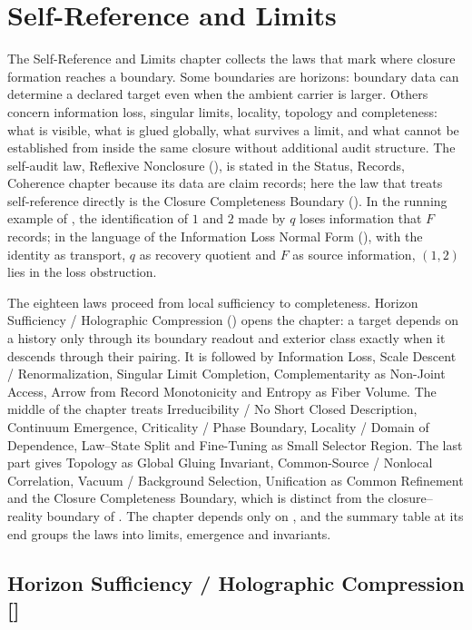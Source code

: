\section{Self-Reference and Limits}\label{sec:self-reference-limits}

The Self-Reference and Limits chapter collects the laws that mark where
closure formation reaches a boundary.  Some boundaries are horizons:
boundary data can determine a declared target even when the ambient
carrier is larger.  Others concern information loss, singular limits,
locality, topology and completeness: what is visible, what is glued
globally, what survives a limit, and what cannot be established from
inside the same closure without additional audit structure.  The
self-audit law, Reflexive Nonclosure (), is stated in the
Status, Records, Coherence chapter because its data are claim records;
here the law that treats self-reference directly is the Closure
Completeness Boundary ().  In the running example of
, the identification of \(1\) and \(2\) made by \(q\)
loses information that \(F\) records; in the language of the
Information Loss Normal Form (), with the identity as
transport, \(q\) as recovery quotient and \(F\) as source information,
\((1,2)\) lies in the loss obstruction.

The eighteen laws proceed from local sufficiency to completeness.
Horizon Sufficiency / Holographic Compression () opens the
chapter: a target depends on a history only through its boundary
readout and exterior class exactly when it descends through their
pairing.  It is followed by Information Loss, Scale Descent /
Renormalization, Singular Limit Completion, Complementarity as
Non-Joint Access, Arrow from Record Monotonicity and Entropy as Fiber
Volume.  The middle of the chapter treats Irreducibility / No Short
Closed Description, Continuum Emergence, Criticality / Phase Boundary,
Locality / Domain of Dependence, Law--State Split and Fine-Tuning as
Small Selector Region.  The last part gives Topology as Global Gluing
Invariant, Common-Source / Nonlocal Correlation, Vacuum / Background
Selection, Unification as Common Refinement and the Closure
Completeness Boundary, which is distinct from the closure--reality
boundary of .  The chapter
depends only on , and the summary table at its end
groups the laws into limits, emergence and invariants.

\subsection{Horizon Sufficiency / Holographic Compression [\texorpdfstring{}{F33}]}\label{sec:self-reference-limits:horizon-sufficiency}


